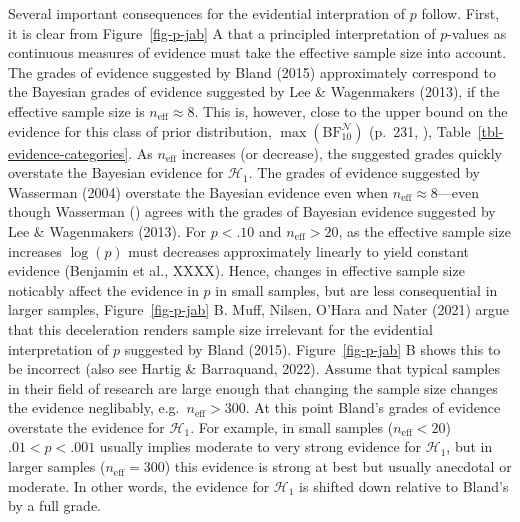 \documentclass[
  man,
  floatsintext,
  longtable,
  nolmodern,
  notxfonts,
  notimes,
  colorlinks=true,linkcolor=blue,citecolor=blue,urlcolor=blue]{apa7}
\begin{document}
Several important consequences for the evidential interpration of \(p\)
follow. First, it is clear from Figure~\ref{fig-p-jab} A that a
principled interpretation of \(p\)-values as continuous measures of
evidence must take the effective sample size into account. The grades of
evidence suggested by Bland (2015) approximately correspond to the
Bayesian grades of evidence suggested by Lee \& Wagenmakers (2013), if
the effective sample size is \(n_\text{eff} \approx 8\). This is,
however, close to the upper bound on the evidence for this class of
prior distribution, \(\max(\text{BF}^{\mathcal{N}}_{10})\) (p.~231,
),
Table~\ref{tbl-evidence-categories}. As \(n_\text{eff}\) increases (or
decrease), the suggested grades quickly overstate the Bayesian evidence
for \(\mathcal{H}_1\). The grades of evidence suggested by Wasserman
(2004) overstate the Bayesian evidence even when
\(n_\text{eff} \approx 8\)---even though Wasserman
() agrees with the grades of Bayesian
evidence suggested by Lee \& Wagenmakers (2013). For \(p < .10\) and
\(n_\text{eff} > 20\), as the effective sample size increases
\(\log(p)\) must decreases approximately linearly to yield constant
evidence (Benjamin et al., XXXX). Hence, changes in effective sample
size noticably affect the evidence in \(p\) in small samples, but are
less consequential in larger samples, Figure~\ref{fig-p-jab} B. Muff,
Nilsen, O'Hara and Nater (2021) argue that this deceleration renders
sample size irrelevant for the evidential interpretation of \(p\)
suggested by Bland (2015). Figure~\ref{fig-p-jab} B shows this to be
incorrect (also see Hartig \& Barraquand, 2022). Assume that typical
samples in their field of research are large enough that changing the
sample size changes the evidence neglibably,
e.g.~\(n_\text{eff} > 300\). At this point Bland's grades of evidence
overstate the evidence for \(\mathcal{H}_1\). For example, in small
samples (\(n_\text{eff} < 20\)) \(.01 < p < .001\) usually implies
moderate to very strong evidence for \(\mathcal{H}_1\), but in larger
samples (\(n_\text{eff} = 300\)) this evidence is strong at best but
usually anecdotal or moderate. In other words, the evidence for
\(\mathcal{H}_1\) is shifted down relative to Bland's by a full grade.
\end{document}
